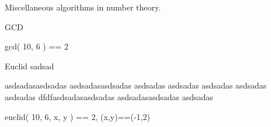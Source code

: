 
\begin{desc}
Miscellaneous algorithms in number theory.
\end{desc}

\begin{algorithm}{GCD}
\characteristics{}
\begin{example}
	gcd( 10, 6 ) == 2
\end{example}
\end{algorithm}


\begin{algorithm}{Euclid}
sadsad

asdsadasasdsadas asdsadasasdsadas asdsadas asdsadas asdsadas asdsadas asdsadas
dfdfasdsadasasdsadas asdsadasasdsadas asdsadas

\begin{example}
	euclid( 10, 6, x, y ) == 2, (x,y)==(-1,2)
\end{example}
\end{algorithm}

\begin{sources}
\end{sources}